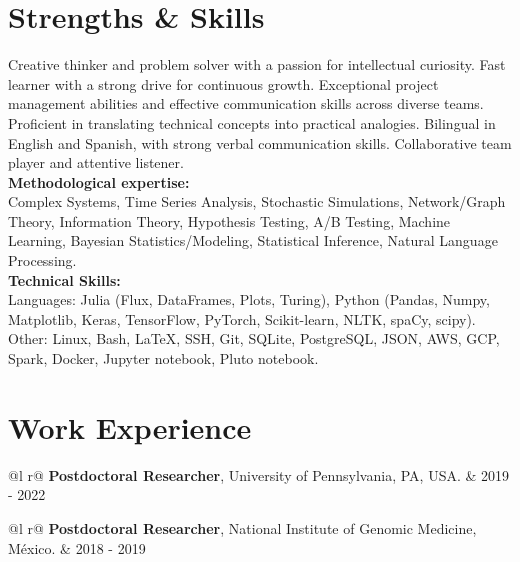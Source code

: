 \documentclass[a4paper,5pt]{article}
\begin{document}
\section{Strengths \& Skills}
Creative thinker and problem solver with a passion for intellectual curiosity. Fast learner with a strong drive for continuous growth. Exceptional project management abilities and effective communication skills across diverse teams. Proficient in translating technical concepts into practical analogies. Bilingual in English and Spanish, with strong verbal communication skills. Collaborative team player and attentive listener.
\\
{\bf Methodological expertise:}\\
Complex Systems, Time Series Analysis, Stochastic Simulations, Network/Graph Theory, Information Theory, Hypothesis Testing, A/B Testing, Machine Learning, Bayesian Statistics/Modeling, Statistical Inference, Natural Language Processing.\\
{\bf Technical Skills:}\\
Languages: Julia (Flux, DataFrames, Plots, Turing), Python (Pandas, Numpy, Matplotlib, Keras, TensorFlow, PyTorch, Scikit-learn, NLTK, spaCy, scipy). Other: Linux, Bash, LaTeX, SSH, Git, SQLite, PostgreSQL, JSON, AWS, GCP, Spark, Docker, Jupyter notebook, Pluto notebook.
\section{Work Experience}
\begin{tabularx}{\linewidth}{ @{}l r@{} }
\textbf{Postdoctoral Researcher}, University of Pennsylvania, PA, USA. & \hfill 2019 - 2022 \\[3.75pt]
\end{tabularx}
\begin{tabularx}{\linewidth}{ @{}l r@{} }
\textbf{Postdoctoral Researcher}, National Institute of Genomic Medicine, M\'exico. & \hfill 2018 - 2019 \\[3.75pt]
\end{tabularx}
\end{document}
